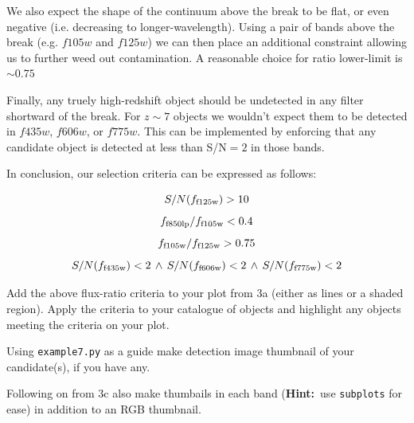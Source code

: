 \documentclass{article}
\newcommand{\hint}{\textbf{Hint:}}
\begin{document}
We also expect the shape of the continuum above the break to be flat, or even negative (i.e. decreasing to longer-wavelength). Using a pair of bands above the break (e.g. $f105w$ and $f125w$) we can then place an additional constraint allowing us to further weed out contamination. A reasonable choice for ratio lower-limit is $\sim 0.75$

Finally, any truely high-redshift object should be undetected in any filter shortward of the break. For $z\sim 7$ objects we wouldn't expect them to be detected in $f435w$, $f606w$, or $f775w$. This can be implemented by enforcing that any candidate object is detected at less than S/N$=2$ in those bands.

In conclusion, our selection criteria can be expressed as follows:

\[
S/N(f_{\rm f125w})>10
\]
\[
f_{\rm f850lp}/f_{\rm f105w}<0.4
\]
\[
f_{\rm f105w}/f_{\rm f125w}>0.75
\]
\[
S/N(f_{\rm f435w})<2\, \land\, S/N(f_{\rm f606w})<2\, \land\, S/N(f_{\rm f775w})<2
\]


\begin{question}
Add the above flux-ratio criteria to your plot from 3a (either as lines or a shaded region). Apply the criteria to your catalogue of objects and highlight any objects meeting the criteria on your plot.
\end{question}


\begin{question}
Using \texttt{example7.py} as a guide make detection image thumbnail of your candidate(s), if you have any.
\end{question}

\begin{question}
Following on from 3c also make thumbails in each band (\hint\ use \texttt{subplots} for ease) in addition to an RGB thumbnail.
\end{question}

\end{document}
